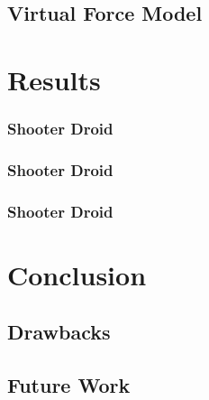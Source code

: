 \documentclass{beamer}
\begin{document}
\subsection{Virtual Force Model}

\section{Results}

\begin{frame}
\frametitle{Shooter Droid}
\begin{center}
\end{center}
\end{frame}

\begin{frame}
\frametitle{Shooter Droid}
\begin{center}
\end{center}
\end{frame}

\begin{frame}
\frametitle{Shooter Droid}
\begin{center}
\end{center}
\end{frame}

\section{Conclusion}

\subsection{Drawbacks}

\subsection{Future Work}
\end{document}
